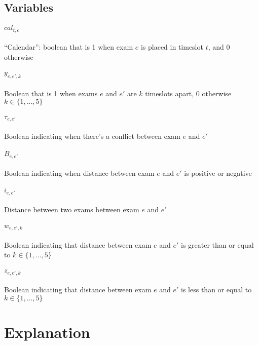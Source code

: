 \documentclass[11pt, a4paper, leqno]{article}
\begin{document}
	\subsection{Variables}
	
	\paragraph{$cal_{t,e}$} ``Calendar'': boolean that is 1 when exam $e$ is placed in timeslot $t$, and 0 otherwise
	
	\paragraph{$y_{e,e',k}$} Boolean that is 1 when exams $e$ and $e'$ are $k$ timeslots apart, 0 otherwise $k \in \{1,\dots,5\}$
	
	\paragraph{$\tau_{e,e'}$} Boolean indicating when there's a conflict between exam $e$ and $e'$
	
	\paragraph{$B_{e,e'}$} Boolean indicating when distance between exam $e$ and $e'$ is positive or negative
	
	\paragraph{$i_{e,e'}$} Distance between two exams between exam $e$ and $e'$
	
	\paragraph{$w_{e,e',k}$} Boolean indicating that distance between exam $e$ and $e'$ is greater than or equal to \mbox{$k \in \{1,\dots,5\}$}
	
	\paragraph{$z_{e,e',k}$} Boolean indicating that distance between exam $e$ and $e'$ is less than or equal to $k \in \{1,\dots,5\}$
	
	
	\section{Explanation}
	
\end{document}
